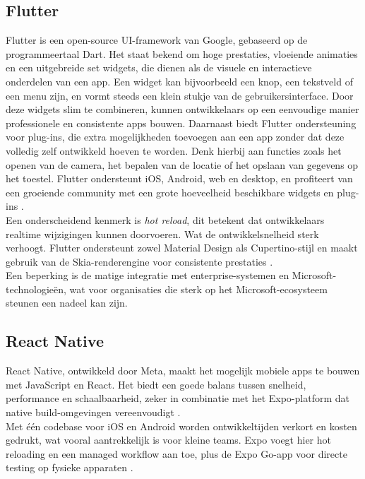 \subsection{Flutter}
Flutter is een open-source UI-framework van Google, gebaseerd op de programmeertaal Dart. Het staat bekend om hoge prestaties, vloeiende animaties en een uitgebreide set widgets, die dienen als de visuele en interactieve onderdelen van een app. Een widget kan bijvoorbeeld een knop, een tekstveld of een menu zijn, en vormt steeds een klein stukje van de gebruikersinterface. Door deze widgets slim te combineren, kunnen ontwikkelaars op een eenvoudige manier professionele en consistente apps bouwen. Daarnaast biedt Flutter ondersteuning voor plug-ins, die extra mogelijkheden toevoegen aan een app zonder dat deze volledig zelf ontwikkeld hoeven te worden. Denk hierbij aan functies zoals het openen van de camera, het bepalen van de locatie of het opslaan van gegevens op het toestel. Flutter ondersteunt iOS, Android, web en desktop, en profiteert van een groeiende community met een grote hoeveelheid beschikbare widgets en plug-ins \autocite{Gajjam2025}.\\

Een onderscheidend kenmerk is \emph{hot reload}, dit betekent dat ontwikkelaars realtime wijzigingen kunnen doorvoeren. Wat de ontwikkelsnelheid sterk verhoogt. Flutter ondersteunt zowel Material Design als Cupertino-stijl en maakt gebruik van de Skia-renderengine voor consistente prestaties \autocite{Dagne2019}.\\

Een beperking is de matige integratie met enterprise-systemen en Microsoft-\\technologieën, wat voor organisaties die sterk op het Microsoft-ecosysteem\\ steunen een nadeel kan zijn.

\subsection{React Native}
React Native, ontwikkeld door Meta, maakt het mogelijk mobiele apps te bouwen met JavaScript en React. Het biedt een goede balans tussen snelheid, performance en schaalbaarheid, zeker in combinatie met het Expo-platform dat native build-omgevingen vereenvoudigt \autocite{Danielsson2016}.\\

Met één codebase voor iOS en Android worden ontwikkeltijden verkort en kosten gedrukt, wat vooral aantrekkelijk is voor kleine teams. Expo voegt hier hot reloading en een managed workflow aan toe, plus de Expo Go-app voor directe testing op fysieke apparaten \autocite{Danielsson2016}.\\

